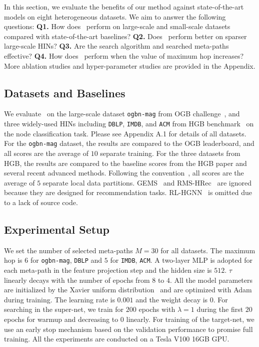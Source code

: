 In this section, we evaluate the benefits of our method against state-of-the-art models on eight heterogeneous datasets. We aim to answer the following questions:  
\textbf{Q1.} How does \model~perform on large-scale and small-scale datasets compared with state-of-the-art baselines? 
\textbf{Q2.} Does \model~perform better on sparser large-scale HINs? 
\textbf{Q3.} Are the search algorithm and searched meta-paths effective? 
\textbf{Q4.} How does \model~perform when the value of maximum hop increases? 
More ablation studies and hyper-parameter studies are provided in the Appendix.

\subsection{Datasets and Baselines}
We evaluate \model~on the large-scale dataset \texttt{ogbn-mag} from OGB challenge~\citep{hu2021ogb}, and three widely-used HINs including \texttt{DBLP}, \texttt{IMDB}, and \texttt{ACM} from HGB benchmark~\citep{lv2021we} on the node classification task. Please see Appendix A.1 for details of all datasets.
For the \texttt{ogbn-mag} dataset, the results are compared to the OGB leaderboard, and all scores are the average of $10$ separate training. For the three datasets from HGB, the results are compared to the baseline scores from the HGB paper and several recent advanced methods. 
Following the convention~\citep{lv2021we,yang2022simple}, all scores are the average of $5$ separate local data partitions. GEMS~\citep{han2020genetic} and RMS-HRec~\citep{ning2022automatic} are ignored because they are designed for recommendation tasks. 
RL-HGNN~\citep{zhong2020reinforcement} is omitted due to a lack of source code. 





\subsection{Experimental Setup}
We set the number of selected meta-paths $M=30$ for all datasets. The maximum hop is $6$ for \texttt{ogbn-mag}, \texttt{DBLP} and $5$ for \texttt{IMDB}, \texttt{ACM}. A two-layer MLP is adopted for each meta-path in the feature projection step and the hidden size is $512$. $\tau$ linearly decays with the number of epochs from $8$ to $4$. All the model parameters are initialized by the Xavier uniform distribution~\citep{DBLP:journals/jmlr/GlorotB10} and are optimized with Adam~\citep{adam} during training.  
The learning rate is $0.001$ and the weight decay is $0$. For searching in the super-net, we train for $200$ epochs with $\lambda=1$ during the first $20$ epochs for warmup and decreasing to $0$ linearly. 
For training of the target-net, we use an early stop mechanism based on the validation performance to promise full training. All the experiments are conducted on a Tesla V100 16GB GPU. 




